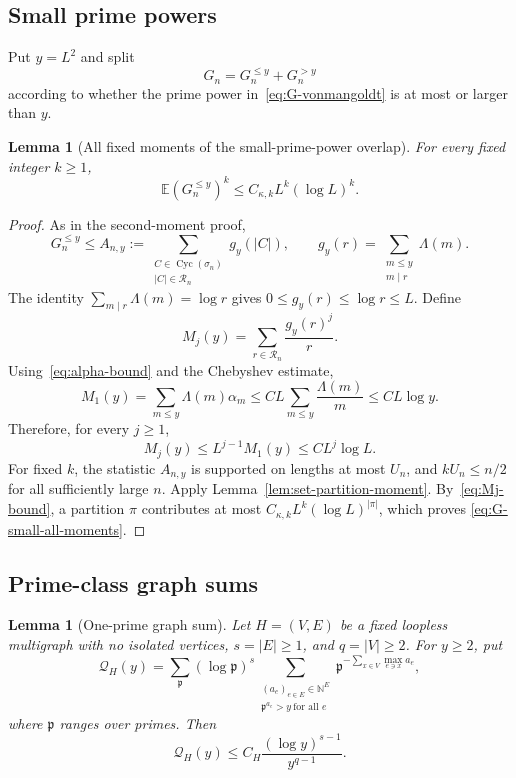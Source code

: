 \documentclass[11pt]{article}
\newtheorem{lemma}[theorem]{Lemma}
\theoremstyle{remark}
\newcommand{\Ee}{\mathbb E}
\newcommand{\Cyc}{\operatorname{Cyc}}
\begin{document}
\subsection{Small prime powers}

Put $y=L^2$ and split
\[
 G_n=G_n^{\le y}+G_n^{>y}
\]
according to whether the prime power in~\eqref{eq:G-vonmangoldt} is at most
or larger than $y$.

\begin{lemma}[All fixed moments of the small-prime-power overlap]
\label{lem:G-small-all-moments}
For every fixed integer $k\ge1$,
\begin{equation}
\label{eq:G-small-all-moments}
 \Ee(G_n^{\le y})^k
 \le C_{\kappa,k}L^k(\log L)^k.
\end{equation}
\end{lemma}

\begin{proof}
As in the second-moment proof,
\[
 G_n^{\le y}
 \le A_{n,y}:=
 \sum_{\substack{C\in\Cyc(\sigma_n)\\|C|\in\mathcal R_n}}g_y(|C|),
 \qquad
 g_y(r)=\sum_{\substack{m\le y\\m\mid r}}\Lambda(m).
\]
The identity $\sum_{m\mid r}\Lambda(m)=\log r$ gives
$0\le g_y(r)\le\log r\le L$.  Define
\[
 M_j(y)=\sum_{r\in\mathcal R_n}\frac{g_y(r)^j}{r}.
\]
Using~\eqref{eq:alpha-bound} and the Chebyshev estimate,
\[
 M_1(y)
 =\sum_{m\le y}\Lambda(m)\alpha_m
 \le CL\sum_{m\le y}\frac{\Lambda(m)}m
 \le CL\log y.\]
Therefore, for every $j\ge1$,
\begin{equation}
\label{eq:Mj-bound}
 M_j(y)\le L^{j-1}M_1(y)\le C L^j\log L.
\end{equation}
For fixed $k$, the statistic $A_{n,y}$ is supported on lengths at most
$U_n$, and $kU_n\le n/2$ for all sufficiently large $n$.  Apply
Lemma~\ref{lem:set-partition-moment}.  By~\eqref{eq:Mj-bound}, a partition
$\pi$ contributes at most
$C_{\kappa,k}L^k(\log L)^{|\pi|}$, which proves
\eqref{eq:G-small-all-moments}.
\end{proof}

\subsection{Prime-class graph sums}

\begin{lemma}[One-prime graph sum]
\label{lem:one-prime-graph}
Let $H=(V,E)$ be a fixed loopless multigraph with no isolated vertices,
$s=|E|\ge1$, and $q=|V|\ge2$.  For $y\ge2$, put
\[
 \mathcal Q_H(y)
 =\sum_{\mathfrak p}(\log\mathfrak p)^s
 \sum_{\substack{(a_e)_{e\in E}\in\mathbb N^E\\
                   \mathfrak p^{a_e}>y\ \text{for all }e}}
 \mathfrak p^{-\sum_{x\in V}\max_{e\ni x}a_e},
\]
where $\mathfrak p$ ranges over primes.  Then
\begin{equation}
\label{eq:one-prime-graph}
 \mathcal Q_H(y)
 \le C_H\frac{(\log y)^{s-1}}{y^{q-1}}.
\end{equation}
\end{lemma}
\end{document}
